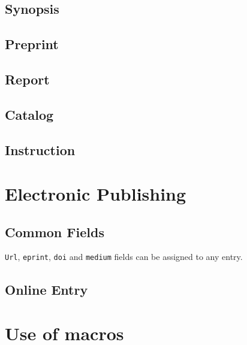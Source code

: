 \documentclass[a4paper]{article}
\begin{document}
\subsection{Synopsis}
\subsection{Preprint}
\subsection{Report}
\subsection{Catalog}
\subsection{Instruction}
\section{Electronic Publishing}
\subsection{Common Fields}
\verb|Url|, \verb|eprint|, \verb|doi| and \verb|medium| fields can be assigned to any entry.
\subsection{Online Entry}
\section{Use of macros}
\end{document}
